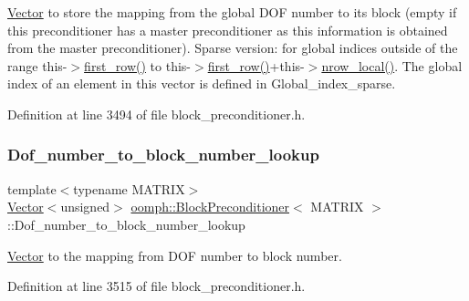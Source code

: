 \hyperlink{classoomph_1_1Vector}{Vector} to store the mapping from the global D\+OF number to its block (empty if this preconditioner has a master preconditioner as this information is obtained from the master preconditioner). Sparse version\+: for global indices outside of the range this-\/$>$\hyperlink{classoomph_1_1DistributableLinearAlgebraObject_ab00a3919b8634c698749f14a4d92947d}{first\+\_\+row()} to this-\/$>$\hyperlink{classoomph_1_1DistributableLinearAlgebraObject_ab00a3919b8634c698749f14a4d92947d}{first\+\_\+row()}+this-\/$>$\hyperlink{classoomph_1_1DistributableLinearAlgebraObject_a9bd7e1d242c69a28da85a804a7717fce}{nrow\+\_\+local()}. The global index of an element in this vector is defined in Global\+\_\+index\+\_\+sparse. 



Definition at line 3494 of file block\+\_\+preconditioner.\+h.

\mbox{\label{classoomph_1_1BlockPreconditioner_ae2f496bfa8307485101a3b8ac57e8c71}} 
\subsubsection{\texorpdfstring{Dof\+\_\+number\+\_\+to\+\_\+block\+\_\+number\+\_\+lookup}{Dof\_number\_to\_block\_number\_lookup}}
{\footnotesize\ttfamily template$<$typename M\+A\+T\+R\+IX$>$ \\
\hyperlink{classoomph_1_1Vector}{Vector}$<$unsigned$>$ \hyperlink{classoomph_1_1BlockPreconditioner}{oomph\+::\+Block\+Preconditioner}$<$ M\+A\+T\+R\+IX $>$\+::Dof\+\_\+number\+\_\+to\+\_\+block\+\_\+number\+\_\+lookup\hspace{0.3cm}{\ttfamily [private]}}



\hyperlink{classoomph_1_1Vector}{Vector} to the mapping from D\+OF number to block number. 



Definition at line 3515 of file block\+\_\+preconditioner.\+h.

\mbox{\label{classoomph_1_1BlockPreconditioner_a015ba85d839a80512c6c4065e39a3d4a}} 
